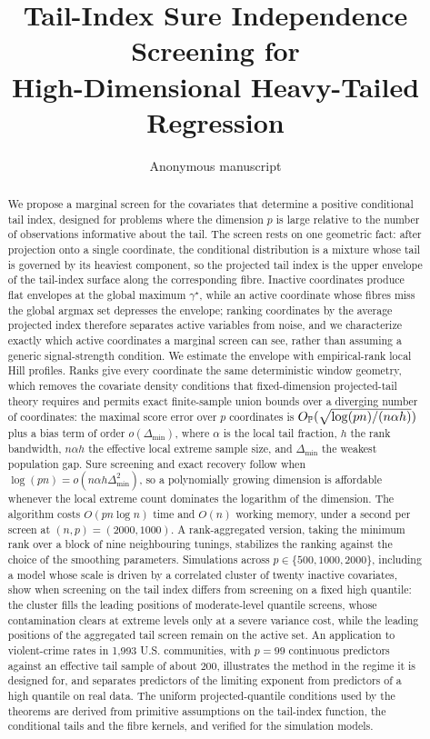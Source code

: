 \documentclass[11pt]{article}
\title{Tail-Index Sure Independence Screening for\\High-Dimensional Heavy-Tailed Regression}
\author{Anonymous manuscript}\date{}
\theoremstyle{remark}\newtheorem{remark}[theorem]{Remark}
\newcommand{\gmax}{\gamma^\star}
\begin{document}
\maketitle
\begin{abstract}
We propose a marginal screen for the covariates that determine a positive
conditional tail index, designed for problems where the dimension $p$ is large
relative to the number of observations informative about the tail. The screen
rests on one geometric fact: after projection onto a single coordinate, the
conditional distribution is a mixture whose tail is governed by its heaviest
component, so the projected tail index is the upper envelope of the tail-index
surface along the corresponding fibre. Inactive coordinates produce flat
envelopes at the global maximum $\gmax$, while an active coordinate whose
fibres miss the global argmax set depresses the envelope; ranking coordinates
by the average projected index therefore separates active variables from
noise, and we characterize exactly which active coordinates a marginal screen
can see, rather than assuming a generic signal-strength condition. We estimate
the envelope with empirical-rank local Hill profiles. Ranks give every
coordinate the same deterministic window geometry, which removes the covariate
density conditions that fixed-dimension projected-tail theory requires and
permits exact finite-sample union bounds over a diverging number of
coordinates: the maximal score error over $p$ coordinates is
$O_{\mathbb P}(\sqrt{\log(pn)/(n\alpha h)})$ plus a bias term of order
$o(\Delta_{\min})$, where $\alpha$ is the local tail fraction, $h$ the rank
bandwidth, $n\alpha h$ the effective local extreme sample size, and
$\Delta_{\min}$ the weakest population gap. Sure screening and exact recovery follow when
$\log(pn)=o(n\alpha h\Delta_{\min}^2)$, so a polynomially growing dimension is
affordable whenever the local extreme count dominates the logarithm of the
dimension. The algorithm costs $O(pn\log n)$ time and $O(n)$ working memory,
under a second per screen at $(n,p)=(2000,1000)$. A rank-aggregated version,
taking the minimum rank over a block of nine neighbouring tunings, stabilizes
the ranking against the choice of the smoothing parameters. Simulations across
$p\in\{500,1000,2000\}$, including a model whose scale is driven by a
correlated cluster of twenty inactive covariates, show when screening on
the tail index differs from screening on a fixed high quantile: the
cluster fills the leading positions of moderate-level quantile screens,
whose contamination clears at extreme levels only at a severe variance
cost, while the leading positions of the aggregated tail screen remain
on the active set. An application to violent-crime rates in 1{,}993
U.S. communities, with $p=99$ continuous predictors against an
effective tail sample of about $200$, illustrates the method in the
regime it is designed for, and separates predictors of the limiting
exponent from predictors of a high quantile on real data. The uniform
projected-quantile conditions used by the theorems are derived from
primitive assumptions on the tail-index function, the conditional tails
and the fibre kernels, and verified for the simulation models.
\end{abstract}
\end{document}
